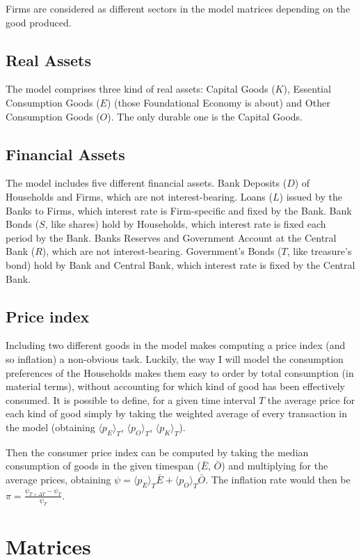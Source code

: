 \documentclass[a4paper, headings=standardclasses]{scrartcl}
\begin{document}
Firms are considered as different sectors in the model matrices depending on the good produced.

\subsection{Real Assets}
The model comprises three kind of real assets: Capital Goods ($K$), Essential Consumption Goods ($E$) (those Foundational Economy is about) and Other Consumption Goods ($O$).
The only durable one is the Capital Goods.

\subsection{Financial Assets}
The model includes five different financial assets.
Bank Deposits ($D$) of Households and Firms, which are not interest-bearing.
Loans ($L$) issued by the Banks to Firms, which interest rate is Firm-specific and fixed by the Bank.
Bank Bonds ($S$, like shares) hold by Households, which interest rate is fixed each period by the Bank.
Banks Reserves and Government Account at the Central Bank ($R$), which are not interest-bearing.
Government's Bonds ($T$, like treasure's bond) hold by Bank and Central Bank, which interest rate is fixed by the Central Bank.

\subsection{Price index}
Including two different goods in the model makes computing a price index (and so inflation) a non-obvious task.
Luckily, the way I will model the consumption preferences of the Households makes them easy to order by total consumption (in material terms), without accounting for which kind of good has been effectively consumed.
It is possible to define, for a given time interval $T$ the average price for each kind of good simply by taking the weighted average of every transaction in the model (obtaining $\langle p_E \rangle_T$, $\langle p_O \rangle_T$, $\langle p_K \rangle_T$).

Then the consumer price index can be computed by taking the median consumption of goods in the given timespan ($\bar{E}$, $\bar{O}$) and multiplying for the average prices, obtaining $\psi = \langle p_E \rangle_T \bar{E} + \langle p_O \rangle_T \bar{O}$. The inflation rate would then be $\pi = \frac{\psi_{T + \Delta T} - \psi_T}{\psi_T}$.


\section{Matrices}
\end{document}
